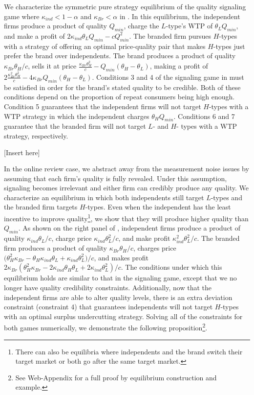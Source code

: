 \documentclass[mksc,blindrev]{informs3} %
\begin{document}
We characterize the symmetric pure strategy equilibrium of the quality signaling game where $\kappa_{ind}<1-\alpha$ and $\kappa_{Br}<\alpha$ in . In this equilibrium, the independent firms produce a product of quality $Q_{min}$, charge the $L$-type's WTP of $\theta_LQ_{min}$, and make a profit of $2 \kappa_{ind} \theta_L Q_{min} - c Q_{min}^2$. The branded firm pursues $H$-types with a strategy of offering an optimal price-quality pair that makes $H$-types just prefer the brand over independents. The brand produces a product of quality $\kappa_{Br}\theta_H/c$, sells it at price $\frac{\kappa_{Br}\theta_H^2}{c}-Q_{min}(\theta_H-\theta_L)$, making a profit of $2\frac{\kappa_{Br}^2\theta_H^2}{c}-4\kappa_{Br} Q_{min}(\theta_H-\theta_L)$. Conditions 3 and 4 of the signaling game in  must be satisfied in order for the brand's stated quality to be credible. Both of these conditions depend on the proportion of repeat consumers being high enough. Condition 5 guarantees that the independent firms will not target $H$-types with a WTP strategy in which the independent charges $\theta_HQ_{min}$. Conditions 6 and 7 guarantee that the branded firm will not target $L$- and $H$- types with a WTP strategy, respectively. 

[Insert  here]

In the online review case, we abstract away from the measurement noise issues by assuming that each firm's quality is fully revealed. Under this assumption, signaling becomes irrelevant and either firm can credibly produce any quality. We characterize an equilibrium in which both independents still target $L$-types and the branded firm targets $H$-types. Even when the independent has the least incentive to improve quality\footnote{There can also be equilibria where independents and the brand switch their target market or both go after the same target market.}, we show that they will produce higher quality than $Q_{min}$. As shown on the right panel of , independent firms produce a product of quality $\kappa_{ind}\theta_L/c$, charge price $\kappa_{ind}\theta_L^2/c$, and make profit $\kappa_{ind}^2\theta_L^2/c$. The branded firm produces a product of quality $\kappa_{Br}\theta_H/c$, charges price $\big(\theta_H^2 \kappa_{Br}-\theta_H \kappa_{ind} \theta_L+\kappa_{ind} \theta_L^2\big)/c$, and makes profit $2 \kappa_{Br} (\theta_H^2 \kappa_{Br}-2 \kappa_{ind} \theta_H \theta_L+2 \kappa_{ind} \theta_L^2)/c$. The conditions under which this equilibrium holds are similar to that in the signaling game, except that we no longer have quality credibility constraints. Additionally, now that the independent firms are able to alter quality levels, there is an extra deviation constraint (constraint 4) that guarantees independents will not target $H$-types with an optimal surplus undercutting strategy. Solving all of the constraints for both games numerically, we demonstrate the following proposition\footnote{See Web-Appendix for a full proof by equilibrium construction and example.}.
\end{document}
